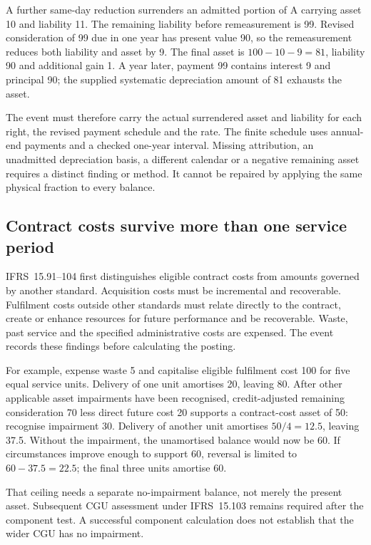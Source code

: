 A further same-day reduction surrenders an admitted portion of A carrying
asset 10 and liability 11. The remaining liability before remeasurement is
99. Revised consideration of 99 due in one year has present value 90, so the
remeasurement reduces both liability and asset by 9. The final asset is
\(100-10-9=81\), liability 90 and additional gain 1. A year later, payment 99
contains interest 9 and principal 90; the supplied systematic depreciation
amount of 81 exhausts the asset.

The event must therefore carry the actual surrendered asset and liability for
each right, the revised payment schedule and the rate. The finite schedule
uses annual-end payments and a checked one-year interval. Missing attribution,
an unadmitted depreciation basis, a different calendar or a negative remaining
asset requires a distinct finding or method. It cannot be repaired by applying
the same physical fraction to every balance.

\subsection{Contract costs survive more than one service period}

IFRS~15.91--104 first distinguishes eligible contract costs from amounts governed
by another standard. Acquisition costs must be incremental and recoverable.
Fulfilment costs outside other standards must relate directly to the contract,
create or enhance resources for future performance and be recoverable. Waste,
past service and the specified administrative costs are expensed. The event
records these findings before calculating the posting.

For example, expense waste 5 and capitalise eligible fulfilment cost 100 for
five equal service units. Delivery of one unit amortises 20, leaving 80. After
other applicable asset impairments have been recognised, credit-adjusted
remaining consideration 70 less direct future cost 20 supports a contract-cost
asset of 50: recognise impairment 30. Delivery of another unit amortises
\(50/4=12.5\), leaving 37.5. Without the impairment, the unamortised balance
would now be 60. If circumstances improve enough to support 60, reversal is
limited to \(60-37.5=22.5\); the final three units amortise 60.

That ceiling needs a separate no-impairment balance, not merely the present
asset. Subsequent CGU assessment under IFRS~15.103 remains required after the
component test. A successful component calculation does not establish that
the wider CGU has no impairment.

